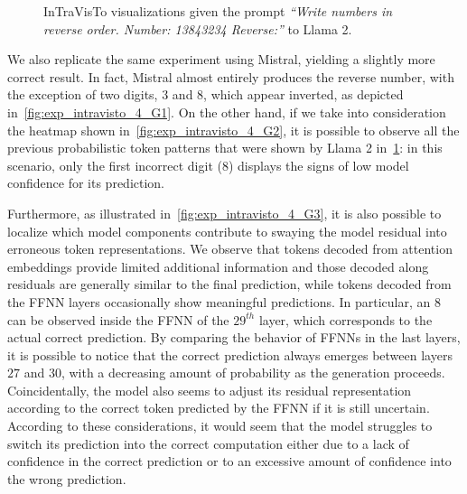 \begin{figure}[t!]
    \centering
    \quad
    \caption{InTraVisTo visualizations given the prompt \emph{``Write numbers in reverse order. Number: 13843234 Reverse:''} to Llama 2.}
    \label{fig:exp_intravisto_4_F}
\end{figure}

We also replicate the same experiment using Mistral, yielding a slightly more correct result.
In fact, Mistral almost entirely produces the reverse number, with the exception of two digits, $3$ and $8$, which appear inverted, as depicted in~\cref{fig:exp_intravisto_4_G1}.
On the other hand, if we take into consideration the heatmap shown in~\cref{fig:exp_intravisto_4_G2}, it is possible to observe all the previous probabilistic token patterns that were shown by Llama 2 in~\cref{fig:exp_intravisto_4_F}: in this scenario, only the first incorrect digit ($8$) displays the signs of low model confidence for its prediction.

Furthermore, as illustrated in~\cref{fig:exp_intravisto_4_G3}, it is also possible to localize which model components contribute to swaying the model residual into erroneous token representations.
We observe that tokens decoded from attention embeddings provide limited additional information and those decoded along residuals are generally similar to the final prediction, while tokens decoded from the FFNN layers occasionally show meaningful predictions.
In particular, an $8$ can be observed inside the FFNN of the $29^{th}$ layer, which corresponds to the actual correct prediction.
By comparing the behavior of FFNNs in the last layers, it is possible to notice that the correct prediction always emerges between layers $27$ and $30$, with a decreasing amount of probability as the generation proceeds.
Coincidentally, the model also seems to adjust its residual representation according to the correct token predicted by the FFNN if it is still uncertain.
According to these considerations, it would seem that the model struggles to switch its prediction into the correct computation either due to a lack of confidence in the correct prediction or to an excessive amount of confidence into the wrong prediction.

